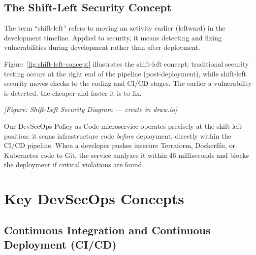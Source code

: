 \subsection{The Shift-Left Security Concept}

The term ``shift-left'' refers to moving an activity earlier (leftward) in the development timeline. Applied to security, it means detecting and fixing vulnerabilities during development rather than after deployment.

Figure~\ref{fig:shift-left-concept} illustrates the shift-left concept: traditional security testing occurs at the right end of the pipeline (post-deployment), while shift-left security moves checks to the coding and CI/CD stages. The earlier a vulnerability is detected, the cheaper and faster it is to fix.


\textit{[Figure: Shift-Left Security Diagram — create in draw.io]}

\noindent Our DevSecOps Policy-as-Code microservice operates precisely at the shift-left position: it scans infrastructure code \textit{before} deployment, directly within the CI/CD pipeline. When a developer pushes insecure Terraform, Dockerfile, or Kubernetes code to Git, the service analyzes it within 46 milliseconds and blocks the deployment if critical violations are found.

\section{Key DevSecOps Concepts}

\subsection{Continuous Integration and Continuous Deployment (CI/CD)}

